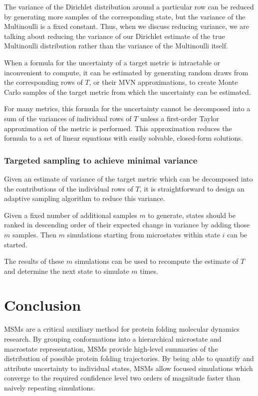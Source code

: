 \documentclass{article}
\begin{document}
The variance of the Dirichlet distribution around a particular row can be reduced by generating more samples of the corresponding state, but the variance of the Multinoulli is a fixed constant. Thus, when we discuss reducing variance, we are talking about reducing the variance of our Dirichlet estimate of the true Multinoulli distribution rather than the variance of the Multinoulli itself.

When a formula for the uncertainty of a target metric is intractable or inconvenient to compute, it can be estimated by generating random draws from the corresponding rows of $T$, or their MVN approximations, to create Monte Carlo samples of the target metric from which the uncertainty can be estimated. 

For many metrics, this formula for the uncertainty cannot be decomposed into a sum of the variances of individual rows of $T$ unless a first-order Taylor approximation of the metric is performed. This approximation reduces the formula to a set of linear equations with easily solvable, closed-form solutions.

\subsubsection{Targeted sampling to achieve minimal variance}
Given an estimate of variance of the target metric which can be decomposed into the contributions of the individual rows of $T$, it is straightforward to design an adaptive sampling algorithm to reduce this variance. 

Given a fixed number of additional samples $m$ to generate, states should be ranked in descending order of their expected change in variance by adding those $m$ samples. Then $m$ simulations starting from microstates within state $i$ can be started. 

The results of these $m$ simulations can be used to recompute the estimate of $T$ and determine the next state to simulate $m$ times.

\section{Conclusion}
MSMs are a critical auxiliary method for protein folding molecular dynamics research. By grouping conformations into a hierarchical microstate and macrostate representation, MSMs provide high-level summaries of the distribution of possible protein folding trajectories. By being able to quantify and attribute uncertainty to individual states, MSMs allow focused simulations which converge to the required confidence level two orders of magnitude faster than naively repeating simulations.

\printbibliography
\end{document}
